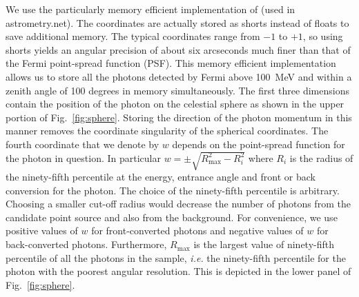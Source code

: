 \documentclass[useAMS,usenatbib]{mn2e}
\begin{document}
We use the particularly memory efficient implementation of
\citet{LangPhD} (used in astrometry.net).  The coordinates are
actually stored as shorts instead of floats to save additional memory.
The typical coordinates range from $-1$ to $+1$, so using shorts
yields an angular precision of about six arcseconds much finer than
that of the Fermi point-spread function (PSF). This memory efficient
implementation allows us to store all the photons detected by Fermi
above 100~MeV and within a zenith angle of 100 degrees in memory
simultaneously.  The first three dimensions contain the position of
the photon on the celestial sphere as shown in the upper portion of
Fig.~\ref{fig:sphere}.  Storing the direction of the photon momentum
in this manner removes the coordinate singularity of the spherical
coordinates.
The fourth
coordinate that we denote by $w$ depends on the point-spread function
for the photon in question.  In particular $w=\pm
\sqrt{R^2_\mathrm{max}-R_i^2}$ where $R_i$ is the radius of the
ninety-fifth percentile at the energy, entrance angle and front or
back conversion for the photon.  The choice of the ninety-fifth
percentile is arbitrary.  Choosing a smaller cut-off radius would
decrease the number of photons from the candidate point source and also
from the background.  For convenience, we use positive values of $w$
for front-converted photons and negative values of $w$ for
back-converted photons.  Furthermore, $R_\mathrm{max}$ is the largest
value of ninety-fifth percentile of all the photons in the sample,
{\em i.e.} the ninety-fifth percentile for the photon with the poorest
angular resolution.  This is depicted in the lower panel of
Fig.~\ref{fig:sphere}.
\end{document}
